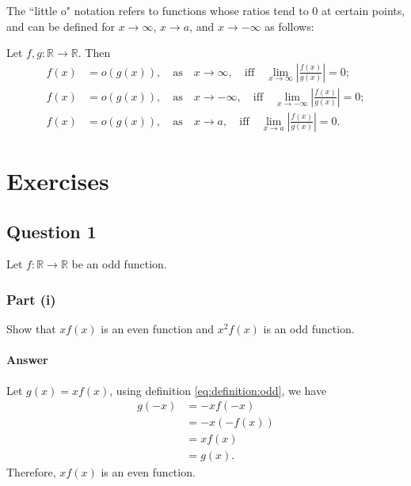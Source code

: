 The ``little o" notation refers to functions whose ratios tend to 0 at certain
    points, and can be defined for $ x \rightarrow \infty $,
    $ x \rightarrow a $, and $ x \rightarrow -\infty $ as follows:
\begin{definition}
    Let $ f,g : \mathbb{R} \rightarrow \mathbb{R} $.
    Then
    \begin{align}
        f(x) &= o(g(x)), \quad \text{as} \quad x \rightarrow \infty, \quad
            \text{iff} \quad \lim_{x \rightarrow \infty}
            \left| \frac{f(x)}{g(x)} \right| = 0; \\
        f(x) &= o(g(x)), \quad \text{as} \quad x \rightarrow -\infty, \quad
            \text{iff} \quad \lim_{x \rightarrow -\infty}
            \left| \frac{f(x)}{g(x)} \right| = 0; \\
        f(x) &= o(g(x)), \quad \text{as} \quad x \rightarrow a, \quad
            \text{iff} \quad \lim_{x \rightarrow a}
            \left| \frac{f(x)}{g(x)} \right| = 0.
    \end{align}
\end{definition}


\section{Exercises}
\subsection{Question 1}
Let $ f : \mathbb{R} \rightarrow \mathbb{R} $ be an odd function.

\subsubsection{Part (i)}
Show that $ x f(x) $ is an even function and $ x^2 f(x) $ is an odd function.

\paragraph{Answer}
Let $ g(x) = x f(x) $, using definition \eqref{eq:definition:odd}, we have
\begin{align*}
    g(-x) &= -x f(-x) \\
          &= -x (-f(x)) \\
          &= x f(x) \\
          &= g(x).
\end{align*}
Therefore, $ x f(x) $ is an even function.

